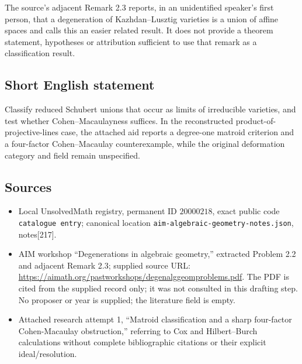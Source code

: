 \documentclass[11pt]{article}
\begin{document}
The source's adjacent Remark 2.3 reports, in an unidentified speaker's first person, that a degeneration of Kazhdan--Lusztig varieties is a union of affine spaces and calls this an easier related result. It does not provide a theorem statement, hypotheses or attribution sufficient to use that remark as a classification result.
\subsection{Short English statement}
Classify reduced Schubert unions that occur as limits of irreducible varieties, and test whether Cohen--Macaulayness suffices. In the reconstructed product-of-projective-lines case, the attached aid reports a degree-one matroid criterion and a four-factor Cohen--Macaulay counterexample, while the original deformation category and field remain unspecified.
\subsection{Sources}
\begin{itemize}
\item Local UnsolvedMath registry, permanent ID \(20000218\), exact public code \texttt{catalogue entry}; canonical location \texttt{aim-algebraic-geometry-notes.json}, notes[217].
\item AIM workshop ``Degenerations in algebraic geometry,'' extracted Problem 2.2 and adjacent Remark 2.3; supplied source URL: \url{https://aimath.org/pastworkshops/degenalggeomproblems.pdf}. The PDF is cited from the supplied record only; it was not consulted in this drafting step. No proposer or year is supplied; the literature field is empty.
\item Attached research attempt 1, ``Matroid classification and a sharp four-factor Cohen-Macaulay obstruction,'' referring to Cox and Hilbert--Burch calculations without complete bibliographic citations or their explicit ideal/resolution.
\end{itemize}
\end{document}

